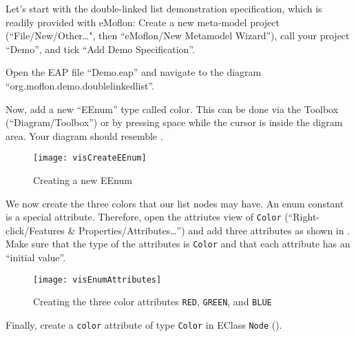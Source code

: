 \genHeader

\begin{stepbystep}

\item 
Let's start with the double-linked list demonstration specification, which is
readily provided with eMoflon:
Create a new meta-model project (``File/New/Other\dots", then ``eMoflon/New
Metamodel Wizard''), call your project ``Demo'', and tick ``Add Demo
Specification''.

\item 
Open the EAP file ``Demo.eap'' and navigate to the diagram
``org.\-moflon.\-demo.\-doublelinkedlist''.

\item 
Now, add a new ``EEnum'' type called color.
This can be done via the Toolbox (``Diagram/Toolbox'') or by pressing space
while the cursor is inside the digram area.
Your diagram should resemble .

\begin{figure}[htbp]
    \begin{center} 
        \texttt{[image: visCreateEEnum]}
        \caption{Creating a new EEnum}  
        \label{enums:vis:createEEnum}
    \end{center}
\end{figure}

\item 
We now create the three colors that our list nodes may have.
An enum constant is a special attribute.
Therefore, open the attriutes view of \texttt{Color} (``Right-click/Features \&
Properties/Attributes\dots'') and add three attributes as shown in
.
Make sure that the type of the attributes is \texttt{Color} and that each
attribute has an ``initial value''.

\begin{figure}[htbp]
    \begin{center} 
        \texttt{[image: visEnumAttributes]}
        \caption{Creating the three color attributes \texttt{RED},
        \texttt{GREEN}, and \texttt{BLUE}}
        \label{enums:vis:enumAttributes}
    \end{center}
\end{figure}

\item 
Finally, create a \texttt{color} attribute of type \texttt{Color} in EClass
\texttt{Node} ().



\end{stepbystep}
